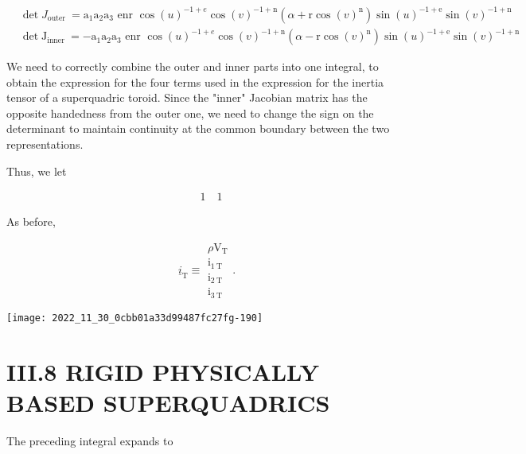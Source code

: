 $$
\begin{aligned}
&\operatorname{det} J_{\text {outer }}=\mathrm{a}_{1} \mathrm{a}_{2} \mathrm{a}_{3} \text { enr } \cos (u)^{-1+e} \cos (v)^{-1+\mathrm{n}}\left(\alpha+\mathrm{r} \cos (v)^{\mathrm{n}}\right) \sin (u)^{-1+\mathrm{e}} \sin (v)^{-1+\mathrm{n}} \\
&\operatorname{det} \mathrm{J}_{\text {inner }}=-\mathrm{a}_{1} \mathrm{a}_{2} \mathrm{a}_{3} \text { enr } \cos (u)^{-1+e} \cos (v)^{-1+\mathrm{n}}\left(\alpha-\mathrm{r} \cos (v)^{\mathrm{n}}\right) \sin (u)^{-1+\mathrm{e}} \sin (v)^{-1+\mathrm{n}}
\end{aligned}
$$

We need to correctly combine the outer and inner parts into one integral, to obtain the expression for the four terms used in the expression for the inertia tensor of a superquadric toroid. Since the "inner" Jacobian matrix has the opposite handedness from the outer one, we need to change the sign on the determinant to maintain continuity at the common boundary between the two representations.

Thus, we let

$$
\begin{aligned}
& 1 \quad 1
\end{aligned}
$$

As before,

$$
\underline{i}_{\mathrm{T}} \equiv \begin{gathered}
\rho \mathrm{V}_{\mathrm{T}} \\
\mathrm{i}_{1 \mathrm{~T}} \\
\mathrm{i}_{2 \mathrm{~T}} \\
\mathrm{i}_{3 \mathrm{~T}}
\end{gathered} .
$$

\begin{center}
\texttt{[image: 2022\_11\_30\_0cbb01a33d99487fc27fg-190]}
\end{center}

\section{III.8 RIGID PHYSICALLY BASED SUPERQUADRICS}
The preceding integral expands to

